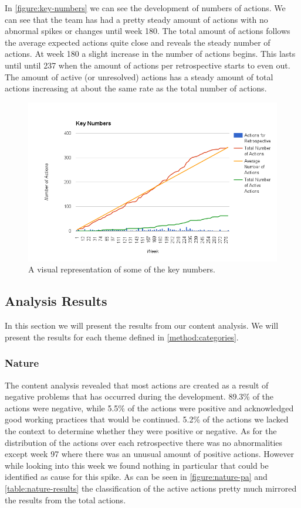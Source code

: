 In \autoref{figure:key-numbers} we can see the development of numbers of actions. We can see that the team has had a pretty steady amount of actions with no abnormal spikes or changes until week 180. The total amount of actions follows the average expected actions quite close and reveals the steady number of actions.
At week 180 a slight increase in the number of actions begins. This lasts until until 237 when the amount of actions per retrospective starts to even out. 
The amount of active (or unresolved) actions has a steady amount of total actions increasing at about the same rate as the total number of actions. 


\begin{figure}[!h]
	\centering
	\includegraphics[width=\textwidth, keepaspectratio]{figures/key-numbers.png}
	\caption{A visual representation of some of the key numbers.}
	\label{figure:key-numbers}
\end{figure}
\clearpage	

\subsection{Analysis Results}
In this section we will present the results from our content analysis. We will present the results for each theme defined in \autoref{method:categories}. 

\subsubsection{Nature}
The content analysis revealed that most actions are created as a result of negative problems that has occurred during the development. 89.3\% of the actions were negative, while 5.5\% of the actions were positive and acknowledged good working practices that would be continued. 5.2\% of the actions we lacked the context to determine whether they were positive or negative. As for the distribution of the actions over each retrospective there was no abnormalities except week 97 where there was an unusual amount of positive actions. However while looking into this week we found nothing in particular that could be identified as cause for this spike. As can be seen in \autoref{figure:nature-pa} and \autoref{table:nature-results} the classification of the active actions pretty much mirrored the results from the total actions. 

